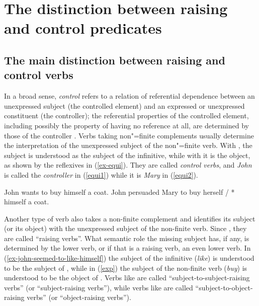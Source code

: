
\section{The distinction between raising and control predicates}
\label{sec-distinction-raising-control}

\subsection{The main distinction between raising and control verbs}

In a broad sense, \emph{control} refers to a relation of referential dependence between an unexpressed
subject (the controlled element) and an expressed or unexpressed constituent (the controller); the
referential properties of the controlled element, including possibly the property of having no
reference at all,
are determined by those of the controller \citep[372]{Bresnan1982}. Verbs taking
non"=finite complements usually determine the interpretation of the unexpressed subject of the
non"=finite verb. With , the subject is understood as the subject of the infinitive,
while with  it is the object, as shown by the reflexives in (\ref{ex-equi}). They are
called \emph{control verbs}, and \emph{John} is called the \emph{controller} in (\ref{equi1}) while
it is \emph{Mary} in (\ref{equi2}).  

\eal
\label{ex-equi}
\ex John wants to buy himself a coat. \label{equi1}
\ex John persuaded Mary to buy herself / * himself a coat.\label{equi2}
\zl

Another type of verb also takes a non-finite complement and identifies its subject (or its object)
with the unexpressed subject of the non-finite verb. Since \citet{Postal1974}, they are called
``raising verbs''. What semantic role the missing subject has, if any, is determined by the lower
verb, or if that is a raising verb, an even lower verb. In (\ref{ex-john-seemed-to-like-himself}) the subject of the
infinitive (\emph{like}) is understood to be the subject of , while in (\ref{exp})
the subject of the non-finite verb (\emph{buy}) is understood to be the object of
. Verbs like  are called ``subject-to-subject-raising verbs'' (or
``subject-raising verbs''), while verbs like  are called ``subject-to-object-raising
verbs'' (or ``object-raising verbs''). 

